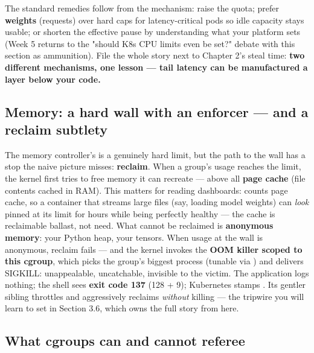 The standard remedies follow from the mechanism: raise the quota; prefer \textbf{weights} (requests) over hard caps for latency-critical pods so idle capacity stays usable; or shorten the effective pause by understanding what your platform sets (Week 5 returns to the "should K8s CPU limits even be set?" debate with this section as ammunition). File the whole story next to Chapter 2's steal time: \textbf{two different mechanisms, one lesson — tail latency can be manufactured a layer below your code.}

\subsection*{Memory: a hard wall with an enforcer — and a reclaim subtlety}

The memory controller's  is a genuinely hard limit, but the path to the wall has a stop the naive picture misses: \textbf{reclaim}. When a group's usage reaches the limit, the kernel first tries to free memory it can recreate — above all \textbf{page cache} (file contents cached in RAM). This matters for reading dashboards:  counts page cache, so a container that streams large files (say, loading model weights) can \textit{look} pinned at its limit for hours while being perfectly healthy — the cache is reclaimable ballast, not need. What cannot be reclaimed is \textbf{anonymous memory}: your Python heap, your tensors. When usage at the wall is anonymous, reclaim fails — and the kernel invokes the \textbf{OOM killer scoped to this cgroup}, which picks the group's biggest process (tunable via ) and delivers SIGKILL: unappealable, uncatchable, invisible to the victim. The application logs nothing; the shell sees \textbf{exit code 137} (128 + 9); Kubernetes stamps . Its gentler sibling  throttles and aggressively reclaims \textit{without} killing — the tripwire you will learn to set in Section 3.6, which owns the full story from here.

\subsection*{What cgroups can and cannot referee}

